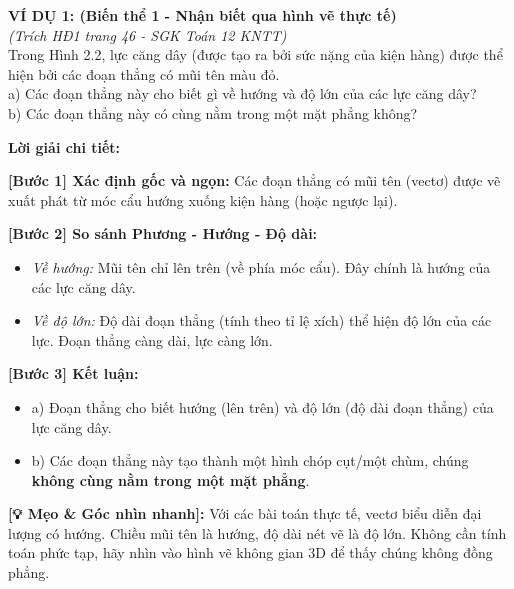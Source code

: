 \documentclass[12pt,a4paper]{article}
\begin{document}
\begin{tcolorbox}[colback=white!95!black, colframe=myred, title=\textbf{KHỐI 4: CÁC VÍ DỤ MINH HỌA MẪU (Phủ hết các biến thể)}]
    
    \textbf{VÍ DỤ 1: (Biến thể 1 - Nhận biết qua hình vẽ thực tế)} \\
    \textit{(Trích HĐ1 trang 46 - SGK Toán 12 KNTT)} \\
    Trong Hình 2.2, lực căng dây (được tạo ra bởi sức nặng của kiện hàng) được thể hiện bởi các đoạn thẳng có mũi tên màu đỏ. \\
    a) Các đoạn thẳng này cho biết gì về hướng và độ lớn của các lực căng dây? \\
    b) Các đoạn thẳng này có cùng nằm trong một mặt phẳng không?
    
    \vspace{0.2cm}
    \textbf{\textcolor{myblue}{Lời giải chi tiết:}}
    
    \textbf{[Bước 1] Xác định gốc và ngọn:} 
    Các đoạn thẳng có mũi tên (vectơ) được vẽ xuất phát từ móc cẩu hướng xuống kiện hàng (hoặc ngược lại).
    
    \textbf{[Bước 2] So sánh Phương - Hướng - Độ dài:}
    \begin{itemize}[leftmargin=*, label=-]
        \item \textit{Về hướng:} Mũi tên chỉ lên trên (về phía móc cẩu). Đây chính là hướng của các lực căng dây.
        \item \textit{Về độ lớn:} Độ dài đoạn thẳng (tính theo tỉ lệ xích) thể hiện độ lớn của các lực. Đoạn thẳng càng dài, lực càng lớn.
    \end{itemize}
    
    \textbf{[Bước 3] Kết luận:}
    \begin{itemize}[leftmargin=*, label=-]
        \item a) Đoạn thẳng cho biết hướng (lên trên) và độ lớn (độ dài đoạn thẳng) của lực căng dây.
        \item b) Các đoạn thẳng này tạo thành một hình chóp cụt/một chùm, chúng \textbf{không cùng nằm trong một mặt phẳng}.
    \end{itemize}
    
    \noindent\textbf{[💡 Mẹo \& Góc nhìn nhanh]:} Với các bài toán thực tế, vectơ biểu diễn đại lượng có hướng. Chiều mũi tên là hướng, độ dài nét vẽ là độ lớn. Không cần tính toán phức tạp, hãy nhìn vào hình vẽ không gian 3D để thấy chúng không đồng phẳng.


\end{tcolorbox}
\end{document}
